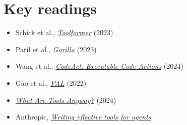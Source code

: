 \documentclass[10pt,oneside]{report}
\begin{document}
\section{Key readings}
\begin{itemize}
\item Schick et al., \href{https://arxiv.org/abs/2302.04761}{\emph{Toolformer}} (2023)
\item Patil et al., \href{https://arxiv.org/abs/2305.15334}{\emph{Gorilla}} (2023)
\item Wang et al., \href{https://arxiv.org/abs/2402.01030}{\emph{CodeAct: Executable Code Actions}} (2024)
\item Gao et al., \href{https://arxiv.org/abs/2211.10435}{\emph{PAL}} (2022)
\item \href{https://arxiv.org/abs/2403.15452}{\emph{What Are Tools Anyway?}} (2024)
\item Anthropic, \href{https://www.anthropic.com/engineering/writing-tools-for-agents}{\emph{Writing effective tools for agents}}
\end{itemize}
\end{document}
